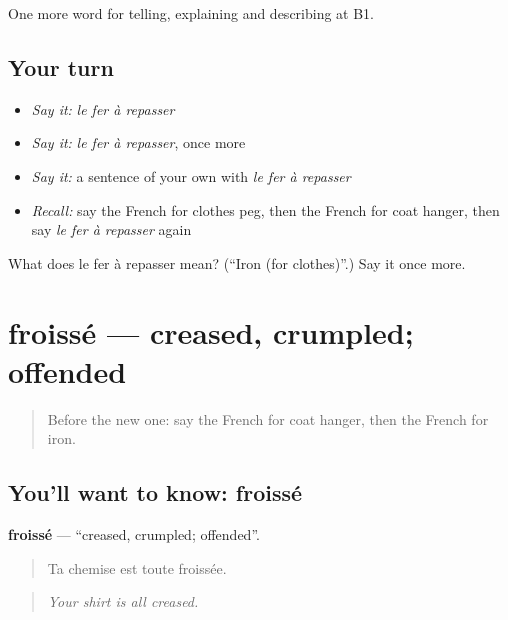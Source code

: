 \begin{grammarlens}[title={What you've built}]
One more word for telling, explaining and describing at B1.
\end{grammarlens}

\subsection*{Your turn}
\begin{itemize}
\raggedright
  \item \emph{Say it:} \emph{le fer à repasser}
  \item \emph{Say it:} \emph{le fer à repasser}, once more
  \item \emph{Say it:} a sentence of your own with \emph{le fer à repasser}
  \item \emph{Recall:} say the French for clothes peg, then the French for coat hanger, then say \emph{le fer à repasser} again
\end{itemize}

\begin{tcolorbox}[breakable,colback=teal!4,colframe=teal!35!black,title={Before you move on}]
What does le fer à repasser mean? (\textquotedblleft{}Iron (for clothes)\textquotedblright{}.) Say it once more.
\end{tcolorbox}
\section[froissé]{froissé — creased, crumpled; offended}

\label{lesson:FR-C527-froisse}



\begin{quote}
Before the new one: say the French for coat hanger, then the French for iron.
\end{quote}

\subsection*{You'll want to know: froissé}
\textbf{froissé} — \textquotedblleft{}creased, crumpled; offended\textquotedblright{}.

\begin{quote}
Ta chemise est toute froissée.
\end{quote}

\begin{quote}
\emph{Your shirt is all creased.}
\end{quote}

